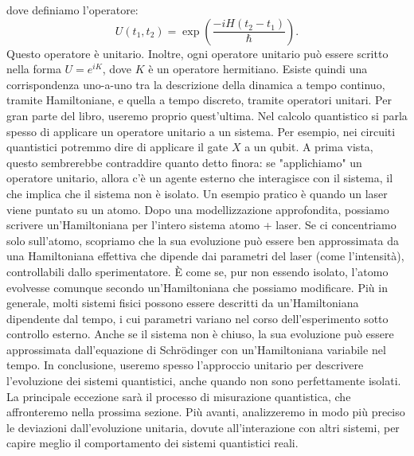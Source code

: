 \documentclass[a4paper,12pt]{report}
\theoremstyle{plain}
\begin{document}
dove definiamo l'operatore:
\[
U(t_1,t_2) = \exp\left(\frac{-iH(t_2 - t_1)}{\hbar}\right).
\]
Questo operatore è unitario. Inoltre, ogni operatore unitario può essere scritto nella forma \( U = e^{iK} \), dove \( K \) è un operatore hermitiano. Esiste quindi una corrispondenza uno-a-uno tra la descrizione della dinamica a tempo continuo, tramite Hamiltoniane, e quella a tempo discreto, tramite operatori unitari. Per gran parte del libro, useremo proprio quest'ultima.
Nel calcolo quantistico si parla spesso di applicare un operatore unitario a un sistema. Per esempio, nei circuiti quantistici potremmo dire di applicare il gate \( X \) a un qubit. A prima vista, questo sembrerebbe contraddire quanto detto finora: se "applichiamo" un operatore unitario, allora c'è un agente esterno che interagisce con il sistema, il che implica che il sistema non è isolato.
Un esempio pratico è quando un laser viene puntato su un atomo. Dopo una modellizzazione approfondita, possiamo scrivere un'Hamiltoniana per l'intero sistema atomo + laser. Se ci concentriamo solo sull'atomo, scopriamo che la sua evoluzione può essere ben approssimata da una Hamiltoniana effettiva che dipende dai parametri del laser (come l'intensità), controllabili dallo sperimentatore.
È come se, pur non essendo isolato, l'atomo evolvesse comunque secondo un'Hamiltoniana che possiamo modificare.
Più in generale, molti sistemi fisici possono essere descritti da un'Hamiltoniana dipendente dal tempo, i cui parametri variano nel corso dell'esperimento sotto controllo esterno. Anche se il sistema non è chiuso, la sua evoluzione può essere approssimata dall'equazione di Schrödinger con un'Hamiltoniana variabile nel tempo.
In conclusione, useremo spesso l'approccio unitario per descrivere l'evoluzione dei sistemi quantistici, anche quando non sono perfettamente isolati. La principale eccezione sarà il processo di misurazione quantistica, che affronteremo nella prossima sezione. Più avanti, analizzeremo in modo più preciso le deviazioni dall'evoluzione unitaria, dovute all'interazione con altri sistemi, per capire meglio il comportamento dei sistemi quantistici reali.
\end{document}
